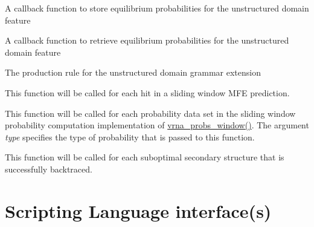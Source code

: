 \begin{DoxyRefList}
\item[Global \mbox{\hyperlink{group__domains__up_gab10498abc84fcaf336aca8f8d7d42eb2}{vrna\+\_\+callback\+\_\+ud\+\_\+probs\+\_\+add}} (vrna\+\_\+fold\+\_\+compound\+\_\+t $\ast$vc, int i, int j, unsigned int loop\+\_\+type, F\+L\+T\+\_\+\+O\+R\+\_\+\+D\+BL exp\+\_\+energy, void $\ast$data)]\label{callbacks__callbacks000011}%
%
 A callback function to store equilibrium probabilities for the unstructured domain feature  
\item[Global \mbox{\hyperlink{group__domains__up_gaa10ba1b6f1e179ea84c5caca9cdaae67}{vrna\+\_\+callback\+\_\+ud\+\_\+probs\+\_\+get}} (vrna\+\_\+fold\+\_\+compound\+\_\+t $\ast$vc, int i, int j, unsigned int loop\+\_\+type, int motif, void $\ast$data)]\label{callbacks__callbacks000012}%
%
 A callback function to retrieve equilibrium probabilities for the unstructured domain feature  
\item[Global \mbox{\hyperlink{group__domains__up_ga4fdfc02c1b660c07f2d887772f02a0a1}{vrna\+\_\+callback\+\_\+ud\+\_\+production}} (vrna\+\_\+fold\+\_\+compound\+\_\+t $\ast$vc, void $\ast$data)]\label{callbacks__callbacks000009}%
%
 The production rule for the unstructured domain grammar extension  
\item[Global \mbox{\hyperlink{group__mfe__window_ga4f3e5bc214ef803074ace313cb9571b4}{vrna\+\_\+mfe\+\_\+window\+\_\+callback}} (int start, int end, const char $\ast$structure, float en, void $\ast$data)]\label{callbacks__callbacks000004}%
%
 This function will be called for each hit in a sliding window M\+FE prediction.  
\item[Global \mbox{\hyperlink{group__part__func__window_gabe710a1182e6db69cc75329dfc9bed67}{vrna\+\_\+probs\+\_\+window\+\_\+callback}} (F\+L\+T\+\_\+\+O\+R\+\_\+\+D\+BL $\ast$pr, int pr\+\_\+size, int i, int max, unsigned int type, void $\ast$data)]\label{callbacks__callbacks000005}%
%
 This function will be called for each probability data set in the sliding window probability computation implementation of \mbox{\hyperlink{group__part__func__window_ga7115d012988541a65ec323c5f17a334b}{vrna\+\_\+probs\+\_\+window()}}. The argument {\itshape type} specifies the type of probability that is passed to this function.  
\item[Global \mbox{\hyperlink{group__subopt__wuchty_gaa0270c66d04f59e750401695b8282e04}{vrna\+\_\+subopt\+\_\+callback}} (const char $\ast$stucture, float energy, void $\ast$data)]\label{callbacks__callbacks000006}%
%
 This function will be called for each suboptimal secondary structure that is successfully backtraced. 
\end{DoxyRefList}\hypertarget{wrappers}{}\section{Scripting Language interface(s)}\label{wrappers}
